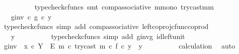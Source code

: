 \begin{isabellebody}
\ \ \ \ \ \ \ \ \isamarkupfalse%
\ {\isacharparenleft}{\kern0pt}typecheck{\isacharunderscore}{\kern0pt}cfuncs{\isacharcomma}{\kern0pt}\ smt\ comp{\isacharunderscore}{\kern0pt}associative{}\ m{\isacharunderscore}{\kern0pt}mono\ try{\isacharunderscore}{\kern0pt}cast{\isacharunderscore}{\kern0pt}m{\isacharunderscore}{\kern0pt}m{\isacharparenright}{\kern0pt}\isanewline
\ \ \ \ \ \ \isamarkupfalse%
\ \isamarkupfalse%
\ {\isachardoublequoteopen}{\isachardot}{\kern0pt}{\isachardot}{\kern0pt}{\isachardot}{\kern0pt}\ {\isacharequal}{\kern0pt}\ {\isacharparenleft}{\kern0pt}g{\isacharunderscore}{\kern0pt}inv\ {\isasymcirc}\isactrlsub c\ g{\isacharparenright}{\kern0pt}\ {\isasymcirc}\isactrlsub c\ y{\isachardoublequoteclose}\isanewline
\ \ \ \ \ \ \ \ \isamarkupfalse%
\ {\isacharparenleft}{\kern0pt}typecheck{\isacharunderscore}{\kern0pt}cfuncs{\isacharcomma}{\kern0pt}\ simp\ add{\isacharcolon}{\kern0pt}\ comp{\isacharunderscore}{\kern0pt}associative{}\ left{\isacharunderscore}{\kern0pt}coproj{\isacharunderscore}{\kern0pt}cfunc{\isacharunderscore}{\kern0pt}coprod{\isacharparenright}{\kern0pt}\isanewline
\ \ \ \ \ \ \isamarkupfalse%
\ \isamarkupfalse%
\ {\isachardoublequoteopen}{\isachardot}{\kern0pt}{\isachardot}{\kern0pt}{\isachardot}{\kern0pt}\ {\isacharequal}{\kern0pt}\ y{\isachardoublequoteclose}\isanewline
\ \ \ \ \ \ \ \ \isamarkupfalse%
\ {\isacharparenleft}{\kern0pt}typecheck{\isacharunderscore}{\kern0pt}cfuncs{\isacharcomma}{\kern0pt}\ simp\ add{\isacharcolon}{\kern0pt}\ g{\isacharunderscore}{\kern0pt}inv{\isacharunderscore}{\kern0pt}g\ id{\isacharunderscore}{\kern0pt}left{\isacharunderscore}{\kern0pt}unit{}{\isacharparenright}{\kern0pt}\isanewline
\ \ \ \ \ \ \isamarkupfalse%
\ \isamarkupfalse%
\ {\isachardoublequoteopen}{\isacharparenleft}{\kern0pt}g{\isacharunderscore}{\kern0pt}inv\ {\isasymamalg}\ {\isacharparenleft}{\kern0pt}x\ {\isasymcirc}\isactrlsub c\ {\isasymbeta}\isactrlbsub Y\ {\isasymsetminus}\ {\isacharparenleft}{\kern0pt}E{\isacharcomma}{\kern0pt}\ m{\isacharparenright}{\kern0pt}\isactrlesub {\isacharparenright}{\kern0pt}\ {\isasymcirc}\isactrlsub c\ try{\isacharunderscore}{\kern0pt}cast\ m{\isacharparenright}{\kern0pt}\ {\isasymcirc}\isactrlsub c\ f\ {\isasymcirc}\isactrlsub c\ y\ {\isacharequal}{\kern0pt}\ y{\isachardoublequoteclose}\isanewline
\ \ \ \ \ \ \ \ \isamarkupfalse%
\ calculation\ \isamarkupfalse%
\ auto\isanewline
\ \ \ \ \isamarkupfalse%

\end{isabellebody}
